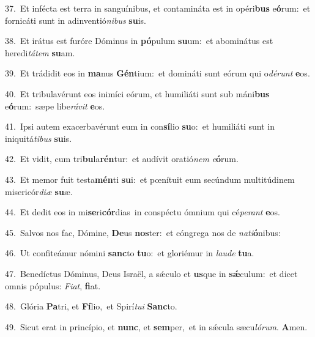 {\numbfont\textcolor{\numbcolor}{37.}}~Et infécta est terra in sanguínibus, et contamináta est in opéri\textbf{bus} e\-\textbf{ó}\-rum:~\star et fornicáti sunt in adinventió\-\textit{ni}\-\textit{bus} \textbf{su}\-is.\par
{\numbfont\textcolor{\numbcolor}{38.}}~Et irátus est furóre Dóminus in \textbf{pó}\-pulum \textbf{su}\-um:~\star et abominátus est heredi\-\textit{tá}\-\textit{tem} \textbf{su}\-am.\par
{\numbfont\textcolor{\numbcolor}{39.}}~Et trádidit eos in \textbf{ma}\-nus \textbf{Gén}\-tium:~\star et domináti sunt eórum qui o\-\textit{dé}\-\textit{runt} \textbf{e}\-os.\par
{\numbfont\textcolor{\numbcolor}{40.}}~Et tribulavérunt eos inimíci eórum, et humiliáti sunt sub máni\textbf{bus} e\-\textbf{ó}\-rum:~\star sæpe libe\-\textit{rá}\-\textit{vit} \textbf{e}\-os.\par
{\numbfont\textcolor{\numbcolor}{41.}}~Ipsi autem exacerbavérunt eum in con\-\textbf{sí}\-lio \textbf{su}\-o:~\star et humiliáti sunt in iniquitá\-\textit{ti}\-\textit{bus} \textbf{su}\-is.\par
{\numbfont\textcolor{\numbcolor}{42.}}~Et vidit, cum tri\-\textbf{bu}\-la\-\textbf{rén}\-tur:~\star et audívit oratió\textit{nem} \textit{e}\-\textbf{ó}rum.\par
{\numbfont\textcolor{\numbcolor}{43.}}~Et memor fuit testa\-\textbf{mén}\-ti \textbf{su}\-i:~\star et pœnítuit eum secúndum multitúdinem misericór\-\textit{di}\-\textit{æ} \textbf{su}\-æ.\par
{\numbfont\textcolor{\numbcolor}{44.}}~Et dedit eos in mi\-\textbf{se}\-ri\-\textbf{cór}\-dias~\star in conspéctu ómnium qui cé\-\textit{pe}\-\textit{rant} \textbf{e}\-os.\par
{\numbfont\textcolor{\numbcolor}{45.}}~Salvos nos fac, Dómine, \textbf{De}\-us \textbf{nos}\-ter:~\star et cóngrega nos de \textit{na}\-\textit{ti}\textbf{ó}nibus:\par
{\numbfont\textcolor{\numbcolor}{46.}}~Ut confiteámur nómini \textbf{sanc}\-to \textbf{tu}\-o:~\star et gloriémur in \textit{lau}\-\textit{de} \textbf{tu}\-a.\par
{\numbfont\textcolor{\numbcolor}{47.}}~Benedíctus Dóminus, Deus Israël, a sǽculo et \textbf{us}\-que in \textbf{sǽ}\-culum:~\star et dicet omnis pópulus: \textit{Fi}\-\textit{at}, \textbf{fi}\-at.\par
{\numbfont\textcolor{\numbcolor}{48.}}~Glória \textbf{Pa}\-tri, et \textbf{Fí}\-lio,~\star et Spirí\-\textit{tu}\-\textit{i} \textbf{Sanc}\-to.\par
{\numbfont\textcolor{\numbcolor}{49.}}~Sicut erat in princípio, et \textbf{nunc}\-, et \textbf{sem}\-per,~\star et in sǽcula sæcu\-\textit{ló}\-\textit{rum}. \textbf{A}\-men.\par
